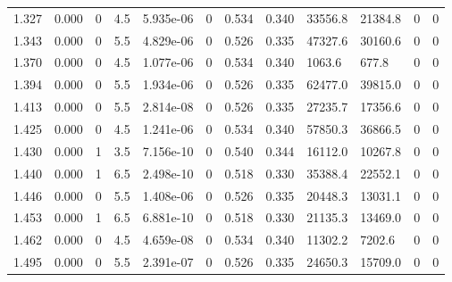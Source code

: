 \documentclass[preview]{standalone}
\begin{document}
{{{\begin{tabular}{L{1.2cm}C{1.2cm} C{0.3cm}C{0.5cm} C{1.4cm}C{1.4cm} C{1.4cm}C{1.4cm} C{1.6cm}C{1.6cm} C{1.6cm}C{1.6cm}}
  1.327  &  0.000  & 0     & 4.5 &  5.935e-06  & 0  &  0.534&   0.340& 33556.8 & 21384.8   &  0 & 0  \\ 
  1.343  &  0.000  & 0     & 5.5 &  4.829e-06  & 0  &  0.526&   0.335& 47327.6 & 30160.6   &  0 & 0  \\ 
  1.370  &  0.000  & 0     & 4.5 &  1.077e-06  & 0  &  0.534&   0.340& 1063.6 & 677.8   &  0 & 0  \\ 
  1.394  &  0.000  & 0     & 5.5 &  1.934e-06  & 0  &  0.526&   0.335& 62477.0 & 39815.0   &  0 & 0  \\ 
  1.413  &  0.000  & 0     & 5.5 &  2.814e-08  & 0  &  0.526&   0.335& 27235.7 & 17356.6   &  0 & 0  \\ 
  1.425  &  0.000  & 0     & 4.5 &  1.241e-06  & 0  &  0.534&   0.340& 57850.3 & 36866.5   &  0 & 0  \\ 
  1.430  &  0.000  & 1     & 3.5 &  7.156e-10  & 0  &  0.540&   0.344& 16112.0 & 10267.8   &  0 & 0  \\ 
  1.440  &  0.000  & 1     & 6.5 &  2.498e-10  & 0  &  0.518&   0.330& 35388.4 & 22552.1   &  0 & 0  \\ 
  1.446  &  0.000  & 0     & 5.5 &  1.408e-06  & 0  &  0.526&   0.335& 20448.3 & 13031.1   &  0 & 0  \\ 
  1.453  &  0.000  & 1     & 6.5 &  6.881e-10  & 0  &  0.518&   0.330& 21135.3 & 13469.0   &  0 & 0  \\ 
  1.462  &  0.000  & 0     & 4.5 &  4.659e-08  & 0  &  0.534&   0.340& 11302.2 & 7202.6   &  0 & 0  \\ 
  1.495  &  0.000  & 0     & 5.5 &  2.391e-07  & 0  &  0.526&   0.335& 24650.3 & 15709.0   &  0 & 0  \\ 
\hline 
\end{tabular} 

}}}
\end{document}
